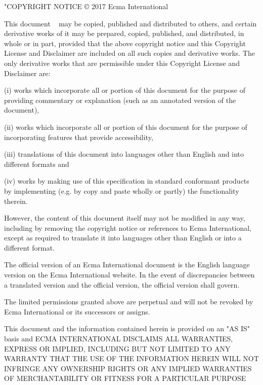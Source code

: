 "COPYRIGHT NOTICE
© 2017
Ecma International

This  document ~\autocite{Json2017}  may  be  copied,  published  and  distributed  to  others,  and  certain  derivative  works  of  it may  be  prepared,  copied,  published,  and  distributed,  in  whole  or  in  part,  provided  that  the  above copyright  notice  and  this  Copyright  License  and  Disclaimer  are  included  on  all  such  copies  and derivative  works.  
The  only  derivative  works  that  are  permissible  under  this  Copyright  License  and Disclaimer are: 

(i) works which incorporate all or portion of this document for the purpose of providing commentary or explanation (such as an annotated version of the document),

(ii)    works  which  incorporate  all  or  portion  of  this  document  for  the  purpose  of  incorporating  features that provide accessibility,

(iii)   translations of this document into languages other than English and into different formats and

(iv)    works  by  making  use  of  this  specification  in  standard  conformant  products  by  implementing  (e.g. by copy and paste wholly or partly) the functionality therein.

However, the content of this document itself may not be modified in any way, including by removing the copyright  notice  or  references  to  Ecma  International,  except  as  required  to  translate  it  into  languages other than English or into a different format.

The  official  version  of  an  Ecma  International  document  is  the  English  language  version  on  the  Ecma International  website.  In  the  event  of  discrepancies  between  a  translated  version  and  the  official version, the official version shall govern.

The limited permissions granted above are perpetual and will not be revoked by Ecma International or its successors or assigns.

This  document  and  the  information  contained  herein  is  provided  on  an  "AS  IS"  basis  and  ECMA INTERNATIONAL  DISCLAIMS  ALL  WARRANTIES,  EXPRESS  OR  IMPLIED,  INCLUDING  BUT  NOT LIMITED   TO   ANY   WARRANTY   THAT   THE   USE   OF   THE   INFORMATION   HEREIN   WILL   NOT INFRINGE ANY OWNERSHIP RIGHTS OR ANY IMPLIED WARRANTIES OF MERCHANTABILITY OR FITNESS FOR A PARTICULAR PURPOSE